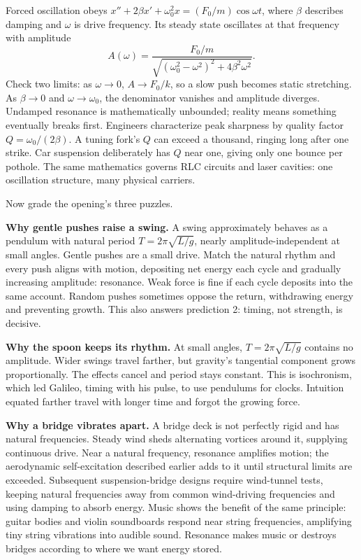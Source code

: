 \begin{challenge}
Forced oscillation obeys \(x''+2\beta x'+\omega_0^2 x=(F_0/m)\cos\omega t\), where \(\beta\) describes damping and \(\omega\) is drive frequency. Its steady state oscillates at that frequency with amplitude
\[
  A(\omega)=\frac{F_0/m}{\sqrt{(\omega_0^{2}-\omega^{2})^{2}+4\beta^{2}\omega^{2}}}.
\]
Check two limits: as \(\omega\to 0\), \(A\to F_0/k\), so a slow push becomes static stretching. As \(\beta\to 0\) and \(\omega\to\omega_0\), the denominator vanishes and amplitude diverges. Undamped resonance is mathematically unbounded; reality means something eventually breaks first. Engineers characterize peak sharpness by quality factor \(Q=\omega_0/(2\beta)\). A tuning fork's \(Q\) can exceed a thousand, ringing long after one strike. Car suspension deliberately has \(Q\) near one, giving only one bounce per pothole. The same mathematics governs RLC circuits and laser cavities: one oscillation structure, many physical carriers.
\end{challenge}


Now grade the opening's three puzzles.

\textbf{Why gentle pushes raise a swing.} A swing approximately behaves as a pendulum with natural period \(T=2\pi\sqrt{L/g}\), nearly amplitude-independent at small angles. Gentle pushes are a small drive. Match the natural rhythm and every push aligns with motion, depositing net energy each cycle and gradually increasing amplitude: resonance. Weak force is fine if each cycle deposits into the same account. Random pushes sometimes oppose the return, withdrawing energy and preventing growth. This also answers prediction 2: timing, not strength, is decisive.

\textbf{Why the spoon keeps its rhythm.} At small angles, \(T=2\pi\sqrt{L/g}\) contains no amplitude. Wider swings travel farther, but gravity's tangential component grows proportionally. The effects cancel and period stays constant. This is isochronism, which led Galileo, timing with his pulse, to use pendulums for clocks. Intuition equated farther travel with longer time and forgot the growing force.

\textbf{Why a bridge vibrates apart.} A bridge deck is not perfectly rigid and has natural frequencies. Steady wind sheds alternating vortices around it, supplying continuous drive. Near a natural frequency, resonance amplifies motion; the aerodynamic self-excitation described earlier adds to it until structural limits are exceeded. Subsequent suspension-bridge designs require wind-tunnel tests, keeping natural frequencies away from common wind-driving frequencies and using damping to absorb energy. Music shows the benefit of the same principle: guitar bodies and violin soundboards respond near string frequencies, amplifying tiny string vibrations into audible sound. Resonance makes music or destroys bridges according to where we want energy stored.

